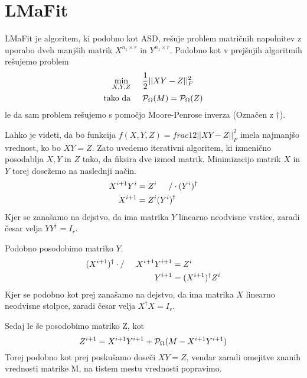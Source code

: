\section{LMaFit}
LMaFit je algoritem, ki podobno kot ASD, rešuje problem matričnih napolnitev z uporabo dveh manjših matrik $X^{n_1 \times r}$ in $Y^{n_1 \times r}$. Podobno kot v prejšnjih algoritmih rešujemo problem 
\begin{align*}
    \min_{X, Y, Z}& \hspace{0.5cm} \frac{1}{2}||XY - Z||_F^2\\
    \text{tako da}& \hspace{0.5cm} \mathcal{P}_\Omega(M) = \mathcal{P}_\Omega(Z)
\end{align*}
le da sam problem rešujemo s pomočjo Moore-Penrose inverza (Označen z $\dagger$).

Lahko je videti, da bo funkcija $f(X,Y,Z) = frac{1}{2}||XY - Z||_F^2$ imela najmanjšo vrednost, ko bo $XY = Z$. Zato uvedemo iterativni algoritem, ki izmenično posodablja $X, Y$ in $Z$ tako, da fiksira dve izmed matrik. Minimizacijo matrik $X$ in $Y$ torej dosežemo na naslednji način.
\begin{align*}
    X^{i+1}Y^{i} &= Z^{i} \hspace{0.5cm} / \cdot (Y^i)^\dagger \\
    X^{i+1} &= Z^{i}(Y^i)^\dagger
\end{align*}
Kjer se zanašamo na dejstvo, da ima matrika $Y$ linearno neodvisne vrstice, zaradi česar velja $YY^\dagger = I_{r}$.

Podobno posodobimo matriko $Y$.
\begin{align*}
    (X^{i+1})^\dagger \cdot / \hspace{0.5cm} X^{i+1}Y^{i+1} &= Z^{i}   \\
    Y^{i+1} &= (X^{i+1})^\dagger Z^{i}
\end{align*}
Kjer se podobno kot prej zanašamo na dejstvo, da ima matrika $X$ linearno neodvisne stolpce, zaradi česar velja $X^\dagger X = I_{r}$.

Sedaj le še posodobimo matriko Z, kot
\[
    Z^{i+1} = X^{i+1}Y^{i+1} + \mathcal{P}_\Omega(M - X^{i+1}Y^{i+1})
\]
Torej podobno kot prej poskušamo doseči $XY = Z$, vendar zaradi omejitve znanih vrednosti matrike M, na tistem mestu vrednosti popravimo. \cite{LMaFit-WY12}

